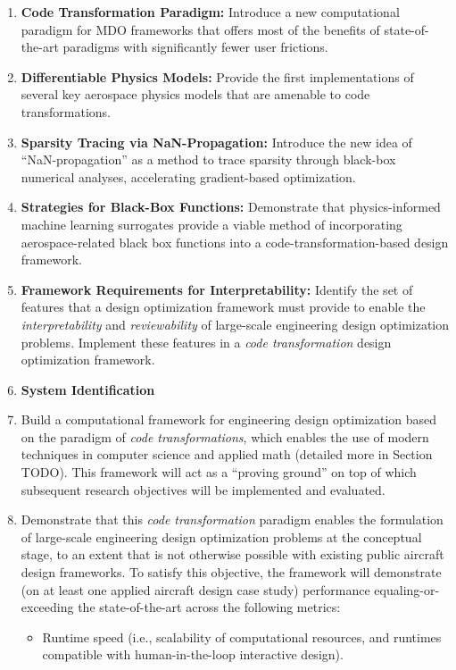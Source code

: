 \documentclass[12pt,vi,oneside]{report}
\begin{document}
    \begin{enumerate}
        \item \textbf{Code Transformation Paradigm:} Introduce a new computational paradigm for MDO frameworks that offers most of the benefits of state-of-the-art paradigms with significantly fewer user frictions.
        \item \textbf{Differentiable Physics Models:} Provide the first implementations of several key aerospace physics models that are amenable to code transformations.
        \item \textbf{Sparsity Tracing via NaN-Propagation:} Introduce the new idea of ``NaN-propagation'' as a method to trace sparsity through black-box numerical analyses, accelerating gradient-based optimization.
        \item \textbf{Strategies for Black-Box Functions:} Demonstrate that physics-informed machine learning surrogates provide a viable method of incorporating aerospace-related black box functions into a code-transformation-based design framework.
        \item \textbf{Framework Requirements for Interpretability:} Identify the set of features that a design optimization framework must provide to enable the \textit{interpretability} and \textit{reviewability} of large-scale engineering design optimization problems. Implement these features in a \textit{code transformation} design optimization framework.
        \item \textbf{System Identification }
        \item Build a computational framework for engineering design optimization based on the paradigm of \textit{code transformations}, which enables the use of modern techniques in computer science and applied math (detailed more in Section TODO). This framework will act as a ``proving ground'' on top of which subsequent research objectives will be implemented and evaluated.
        \item Demonstrate that this \textit{code transformation} paradigm enables the formulation of large-scale engineering design optimization problems at the conceptual stage, to an extent that is not otherwise possible with existing public aircraft design frameworks. To satisfy this objective, the framework will demonstrate (on at least one applied aircraft design case study) performance equaling-or-exceeding the state-of-the-art across the following metrics:
        \begin{itemize}
            \item Runtime speed (i.e., scalability of computational resources, and runtimes compatible with human-in-the-loop interactive design).

\end{itemize}
\end{enumerate}
\end{document}
